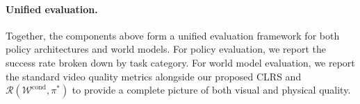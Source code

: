\documentclass{article}
\newcommand{\weihan}[1]{\textcolor{purple}{\textbf{weihan}: #1}}
\begin{document}

\paragraph{Unified evaluation.}
Together, the components above form a unified evaluation framework for both policy architectures and world models. For policy evaluation, we report the success rate broken down by task category. For world model evaluation, we report the standard video quality metrics alongside our proposed CLRS and $\mathcal{R}(\mathcal{W}^{\text{cond}}, \pi^*)$ to provide a complete picture of both visual and physical quality.

\end{document}
